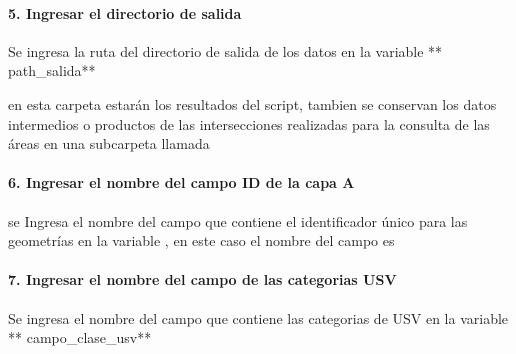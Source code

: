 \documentclass[letterpaper,10pt,spanish]{sphinxmanual}
\begin{document}
\paragraph{5. Ingresar el directorio de salida}
\label{\detokenize{nivel_geometrias:ingresar-el-directorio-de-salida}}
Se ingresa la ruta del directorio de salida de los datos en la variable
** path\_salida**

\begin{sphinxVerbatim}[commandchars=\\\{\}]
  
\end{sphinxVerbatim}

en esta carpeta estarán los resultados del script, tambien se conservan los datos
intermedios o productos de las intersecciones realizadas para la consulta de las áreas
en una subcarpeta llamada 


\paragraph{6. Ingresar el nombre del campo ID de la capa A}
\label{\detokenize{nivel_geometrias:ingresar-el-nombre-del-campo-id-de-la-capa-a}}
se Ingresa el nombre del campo que contiene el identificador único
para las geometrías en la variable , en este caso el nombre del campo  es 

\begin{sphinxVerbatim}[commandchars=\\\{\}]
  
\end{sphinxVerbatim}


\paragraph{7. Ingresar el nombre del campo de las categorias USV}
\label{\detokenize{nivel_geometrias:ingresar-el-nombre-del-campo-de-las-categorias-usv}}
Se ingresa el nombre del campo que contiene las categorias de USV en la
variable ** campo\_clase\_usv**

\begin{sphinxVerbatim}[commandchars=\\\{\}]
  
\end{sphinxVerbatim}
\end{document}
